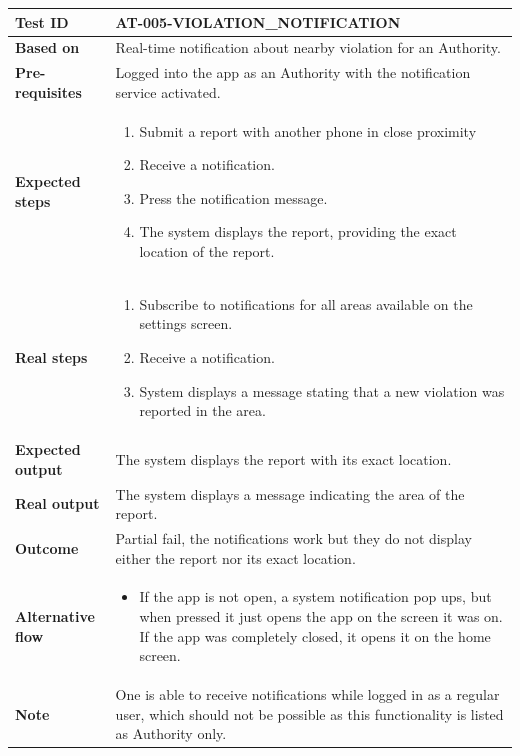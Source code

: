 \begin{table}[H]
    \centering
    \begin{tabular}{p{3cm}p{10cm}}
    \textbf{Test ID} & AT-005-VIOLATION\_NOTIFICATION \\ \hline
    \textbf{Based on} & Real-time notiﬁcation about nearby violation for an Authority. \\ \hline
    \textbf{Pre-requisites} & Logged into the app as an Authority with the notification service activated. \\ \hline
    \textbf{Expected steps} & 
        \begin{enumerate} \itemsep0em
            \item Submit a report with another phone in close proximity
            \item Receive a notification.
            \item Press the notification message.
            \item The system displays the report, providing the exact location of the report.
        \end{enumerate} \\ \hline
    \textbf{Real steps} & 
        \begin{enumerate} \itemsep0em
            \item Subscribe to notifications for all areas available on the settings screen.
            \item Receive a notification.
            \item System displays a message stating that a new violation was reported in the area.
        \end{enumerate} \\ \hline
    \textbf{Expected output} & The system displays the report with its exact location. \\ \hline
    \textbf{Real output} & The system displays a message indicating the area of the report. \\ \hline
    \textbf{Outcome} & Partial fail, the notifications work but they do not display either the report nor its exact location. \\ \hline
    \textbf{Alternative flow} & 
        \begin{itemize} \itemsep0em
            \item If the app is not open, a system notification pop ups, but when pressed it just opens the app on the screen it was on. If the app was completely closed, it opens it on the home screen.
        \end{itemize} \\ \hline
    \textbf{Note} & One is able to receive notifications while logged in as a regular user, which should not be possible as this functionality is listed as Authority only. \\ \hline
    \end{tabular}
\end{table}


